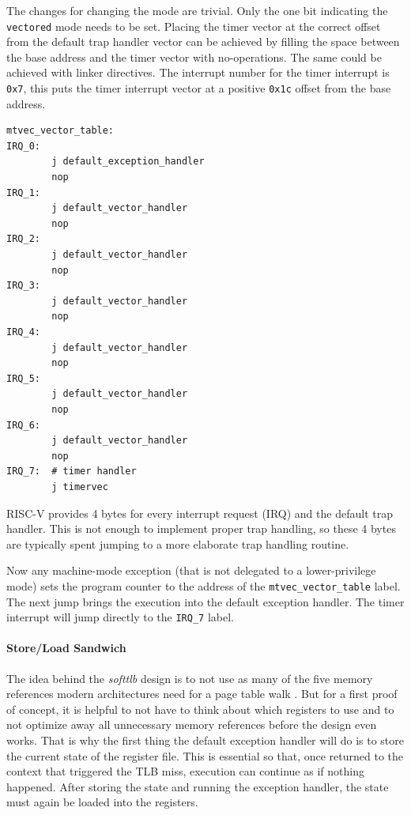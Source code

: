 The changes for changing the mode are trivial. Only the one bit indicating the \texttt{vectored} mode
needs to be set.
Placing the timer vector at the correct offset from the default trap handler vector can be achieved by
filling the space between the base address and the timer vector with no-operations. The same could be
achieved with linker directives.
The interrupt number for the timer interrupt is \texttt{0x7}, this puts the timer interrupt vector
at a positive \texttt{0x1c} offset from the base address.

\begin{lstlisting}[language={[RISC-V]Assembler},float=h!,
    label={lst:defaultTrapHandler}, caption={Vectored Trap Handler Routine}]
mtvec_vector_table:
IRQ_0:
        j default_exception_handler
        nop
IRQ_1:
        j default_vector_handler
        nop
IRQ_2:
        j default_vector_handler
        nop
IRQ_3:
        j default_vector_handler
        nop
IRQ_4:
        j default_vector_handler
        nop
IRQ_5:
        j default_vector_handler
        nop
IRQ_6:
        j default_vector_handler
        nop
IRQ_7:  # timer handler
        j timervec
\end{lstlisting}


RISC-V provides 4 bytes for every interrupt request (IRQ) and the default trap handler. This is not enough
to implement proper trap handling, so these 4 bytes are typically spent jumping to a more elaborate trap
handling routine.

Now any machine-mode exception (that is not delegated to a lower-privilege mode) sets the program counter
to the address of the \texttt{mtvec\_vector\_table} label. The next jump brings the execution into
the default exception handler.
The timer interrupt will jump directly to the \texttt{IRQ\_7} label.

\paragraph{Store/Load Sandwich} The idea behind the \textit{softtlb} design is to not use as many of the five
memory references modern architectures need for a page table walk \cite{intel5LevelPaging5Level2017}. But
for a first proof of concept, it is helpful to not have to think about which registers to use and to not optimize
away all unnecessary memory references before the design even works.
That is why the first thing the default exception handler will do is to store the current state of the register
file.
This is essential so that, once returned to the context that triggered the TLB miss, execution can continue
as if nothing happened.
After storing the state and running the exception handler, the state must again be loaded into the registers.

